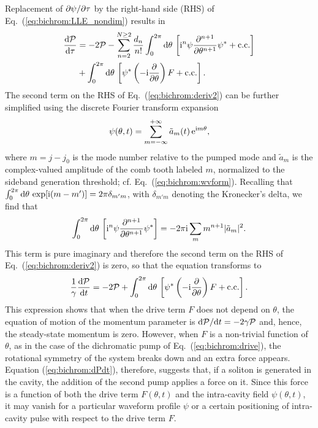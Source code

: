 Replacement of $\partial \psi/\partial \tau$ by the right-hand side (RHS) of Eq.~(\ref{eq:bichrom:LLE_nondim}) results in
%
\begin{align}\label{eq:bichrom:deriv2}
\frac{\mathrm{d}\mathcal{P}}{\mathrm{d}\tau} &= - 2 \mathcal{P} - \sum_{n = 2}^{N \ge 2} \frac{d_n}{n!} \int_{0}^{2\pi} \mathrm{d} \theta \, \left[ \mathrm{i}^n \psi \frac{\partial^{n+1}}{\partial \theta^{n+1}} \psi^* + \mathrm{c.c.} \right] \nonumber \\
& + \int_{0}^{2\pi} \mathrm{d} \theta \, \left[ \psi^* \left( -\mathrm{i} \frac{\partial}{\partial \theta} \right) F + \mathrm{c.c.} \right].
\end{align}
%
The second term on the RHS of Eq.~(\ref{eq:bichrom:deriv2}) can be further simplified using the discrete Fourier transform expansion
%
\begin{equation}
\psi(\theta, t) = \sum_{m=-\infty}^{+\infty} \tilde{a}_m (t) \, \mathrm{e}^{\mathrm{i} m \theta},
\end{equation}
%
where $m = j - j_0$ is the mode number relative to the pumped mode and $\tilde{a}_m$ is the complex-valued amplitude of the comb tooth labeled $m$, normalized to the sideband generation threshold; cf. Eq.~(\ref{eq:bichrom:wvform}). Recalling that $ \int_{0}^{2\pi} \mathrm{d} \theta \, \exp [ \mathrm{i} (m - m') ] = 2 \pi \delta_{m' m}$, with $\delta_{m' m}$ denoting the Kronecker's delta, we find that
%
\begin{equation}
\int_{0}^{2\pi} \mathrm{d} \theta \, \left[ \mathrm{i}^n \psi \frac{\partial^{n+1}}{\partial \theta^{n+1}} \psi^* \right] = -2 \pi \mathrm{i} \sum_m m^{n+1} \lvert\tilde{a}_m\rvert^2.
\end{equation}
%
This term is pure imaginary and therefore the second term on the RHS of Eq.~(\ref{eq:bichrom:deriv2}) is zero,  so that the equation transforms to
%
\begin{equation} \label{eq:bichrom:dPdt}
\frac{1}{\gamma} \frac{\mathrm{d}\mathcal{P}}{\mathrm{d}t} = -2 \mathcal{P} + \int_{0}^{2\pi} \mathrm{d} \theta \, \left[ \psi^* \left( -\mathrm{i} \frac{\partial}{\partial \theta} \right) F + \mathrm{c.c.} \right].
\end{equation}
%
This expression shows that when the drive term $F$ does not depend on $\theta$, the equation of motion of the momentum parameter is $\mathrm{d}\mathcal{P}/\mathrm{d}t = -2 \gamma \mathcal{P}$ and, hence, the steady-state momentum is zero. However, when $F$ is a non-trivial function of $\theta$, as in the case of the dichromatic pump of Eq.~(\ref{eq:bichrom:drive}), the rotational symmetry of the system breaks down and an extra force appears. Equation (\ref{eq:bichrom:dPdt}), therefore, suggests that, if a soliton is generated in the cavity, the addition of the second pump applies a force on it. Since this force is a function of both the drive term $F(\theta, t)$ and the intra-cavity field $\psi(\theta, t)$, it may vanish for a particular waveform profile $\psi$ or a certain positioning of intra-cavity pulse with respect to the drive term $F$.

